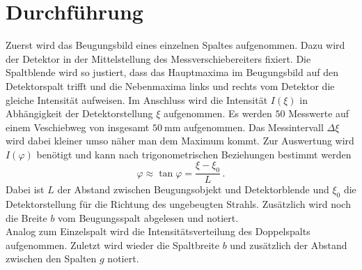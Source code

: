 \section{Durchführung}
\label{sec:Durchführung}
Zuerst wird das Beugungsbild eines einzelnen Spaltes aufgenommen.
Dazu wird der Detektor in der Mittelstellung des Messverschiebereiters fixiert.
Die Spaltblende wird so justiert, dass das Hauptmaxima im Beugungsbild auf den Detektorspalt trifft und die Nebenmaxima links und rechts vom Detektor die gleiche Intensität aufweisen.
Im Anschluss wird die Intensität $I(\xi)$ in Abhängigkeit der Detektorstellung $\xi$ aufgenommen.
Es werden $50$ Messwerte auf einem Veschiebweg von insgesamt $\SI{50}{\milli\metre}$ aufgenommen.
Das Messintervall $\Delta \xi$ wird dabei kleiner umso näher man dem Maximum kommt.
Zur Auswertung wird $I(\varphi)$ benötigt und kann nach trigonometrischen Beziehungen bestimmt werden
\begin{equation}
    \varphi \approx \tan \varphi = \frac{\xi - \xi_0}{L} \, .
\end{equation} 
Dabei ist $L$ der Abstand zwischen Beugungsobjekt und Detektorblende und $\xi_0$ die Detektorstellung für die Richtung des ungebeugten Strahls.
Zusätzlich wird noch die Breite $b$ vom Beugungsspalt abgelesen und notiert.
\\
Analog zum Einzelspalt wird die Intensitätsverteilung des Doppelspalts aufgenommen.
Zuletzt wird wieder die Spaltbreite $b$ und zusätzlich der Abstand zwischen den Spalten $g$ notiert.